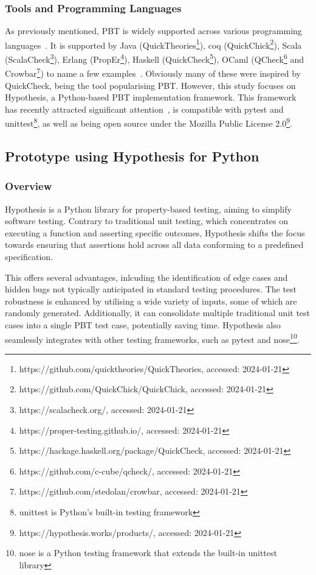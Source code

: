 \documentclass[runningheads]{llncs}
\begin{document}
\subsubsection{Tools and Programming Languages}
As previously mentioned, PBT is widely supported across various programming languages~\cite{Chen2022,Shi2023}. It is supported by Java (QuickTheories\footnote{https://github.com/quicktheories/QuickTheories, accessed: 2024-01-21}), coq (QuickChick\footnote{https://github.com/QuickChick/QuickChick, accessed: 2024-01-21}), Scala (ScalaCheck\footnote{https://scalacheck.org/, accessed: 2024-01-21}), Erlang (PropEr\footnote{https://proper-testing.github.io/, accessed: 2024-01-21}), Haskell (QuickCheck\footnote{https://hackage.haskell.org/package/QuickCheck, accessed: 2024-01-21}), OCaml (QCheck\footnote{https://github.com/c-cube/qcheck/, accessed: 2024-01-21} and Crowbar\footnote{https://github.com/stedolan/crowbar, accessed: 2024-01-21}) to name a few examples~\cite{MacIver2016,Padhye2019,Paraskevopoulou2015,Arts2008,Papadakis2011,Claessen2000}. Obviously many of these were inspired by QuickCheck, being the tool popularising PBT. However, this study focuses on Hypothesis, a Python-based PBT implementation framework. This framework has recently attracted significant attention~\cite{Corgozinho2023,MacIver2019}, is compatible with pytest and unittest\footnote{unittest is Python's built-in testing framework}, as well as being open source under the Mozilla Public License 2.0\footnote{https://hypothesis.works/products/, accessed: 2024-01-21}.

\subsection{Prototype using Hypothesis for Python}
\subsubsection{Overview}
Hypothesis is a Python library for property-based testing, aiming to simplify software testing. Contrary to traditional unit testing, which concentrates on executing a function and asserting specific outcomes, Hypothesis shifts the focus towards ensuring that assertions hold across all data conforming to a predefined specification.

This offers several advantages, inlcuding the identification of edge cases and hidden bugs not typically anticipated in standard testing procedures. The test robustness is enhanced by utilising a wide variety of inputs, some of which are randomly generated. Additionally, it can consolidate multiple traditional unit test cases into a single PBT test case, potentially saving time. Hypothesis also seamlessly integrates with other testing frameworks, such as pytest and nose\footnote{nose is a Python testing framework that extends the built-in unittest library}.
\end{document}
